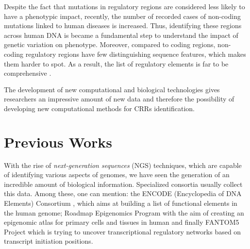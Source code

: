 Despite the fact that mutations in regulatory regions are considered less likely to have a phenotypic impact, recently, the number of recorded cases of non-coding mutations linked to human diseases is increased.
Thus, identifying these regions across
human DNA is became a fundamental step to understand the impact of
genetic variation on phenotype. 
Moreover, compared to coding regions, non-coding regulatory regions have few distinguishing sequence features, which makes them harder to spot. As a result, the list of regulatory elements is far to be comprehensive \cite{NarlikarRegulaotryelements}. 

The development of new computational and
biological technologies gives researchers an impressive amount of new data and therefore the possibility of developing new computational methods
for CRRs identification.



\section{Previous Works}
With the rise of \emph{next-generation sequences} (NGS) techniques, which are
capable of identifying various aspects of genomes, we have seen the generation of an incredible amount of biological information. Specialized consortia usually collect this data. Among these, one can mention: the ENCODE
(Encyclopedia of DNA Elements) Consortium \cite{ENCODE_data}, which aims at building a list of functional elements in the human genome; Roadmap Epigenomics Program \cite{ROADMAP} with the aim of creating an epigenomic atlas for primary cells and tissues in human and finally FANTOM5 Project \cite{FANTOM_data} which is trying to uncover transcriptional regulatory networks based on transcript initiation positions.

